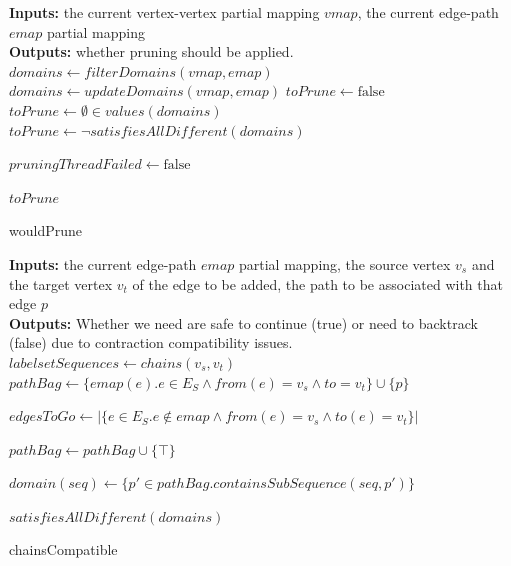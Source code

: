 \begin{algorithm}
\DontPrintSemicolon
\SetAlgoLined
\LinesNumbered
\textbf{Inputs: } the current vertex-vertex partial mapping $\mathit{vmap}$, the current edge-path $\mathit{emap}$ partial mapping\\
\textbf{Outputs: } whether pruning should be applied.\\

 {
	$\mathit{domains} \longleftarrow \mathit{filterDomains}(\mathit{vmap}, \mathit{emap})$\;
}  {
	$\mathit{domains} \longleftarrow \mathit{updateDomains}(\mathit{vmap}, \mathit{emap})$\;
} 
$\mathit{toPrune} \longleftarrow \text{false}$\;
 {
	$\mathit{toPrune} \longleftarrow \emptyset \in \mathit{values}(\mathit{domains})$\hspace{6cm}\;
}  {
	$\mathit{toPrune} \longleftarrow \lnot \mathit{satisfiesAllDifferent}(\mathit{domains})$\hspace{4.2cm}\;
}

 {
	$\mathit{pruningThreadFailed} \longleftarrow \text{false}$\;
}

\color{black}
\Return $\mathit{toPrune}$\;
 \caption{wouldPrune}
 \label{algorithm:wouldPrune-ext}
\end{algorithm}


\begin{algorithm}
\SetAlgoLined
\LinesNumbered
\textbf{Inputs: } the current edge-path $\mathit{emap}$ partial mapping, the source vertex $v_s$ and the target vertex $v_t$ of the edge to be added, the path to be associated with that edge $p$\\
\textbf{Outputs: } Whether we need are safe to continue (true) or need to backtrack (false) due to contraction compatibility issues.\\
$\mathit{labelsetSequences} \longleftarrow \mathit{chains}(v_s, v_t)$\;
$\mathit{pathBag} \longleftarrow \{\mathit{emap}(e) . e \in E_S \land \mathit{from}(e)=v_s \land \mathit{to}=v_t \} \cup \{p\}$\;

$\mathit{edgesToGo} \longleftarrow |\{e \in E_S . e \not \in \mathit{emap} \land \mathit{from}(e)=v_s \land \mathit{to}(e)=v_t\}|$

 {
		$\mathit{pathBag}\longleftarrow \mathit{pathBag} \cup \{\top\}$\;	
}

 {
	$\mathit{domain}(\mathit{seq})\longleftarrow \{p' \in \mathit{pathBag} . \mathit{containsSubSequence}(\mathit{seq}, p')\}$\;
}

\Return $\mathit{satisfiesAllDifferent}(\mathit{domains})$\;

 \caption{chainsCompatible}
 \label{algorithm:chainsCompatible}
\end{algorithm}


